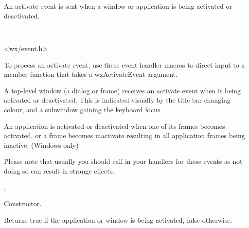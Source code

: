 \section{}\label{wxactivateevent}

An activate event is sent when a window or application is being activated
or deactivated.


\\


<wx/event.h>


To process an activate event, use these event handler macros to direct input to a member
function that takes a wxActivateEvent argument.

\twocolwidtha{7cm}
\begin{twocollist}\itemsep=0pt
\end{twocollist}%


A top-level window (a dialog or frame) receives an activate event when is
being activated or deactivated. This is indicated visually by the title
bar changing colour, and a subwindow gaining the keyboard focus.

An application is activated or deactivated when one of its frames becomes activated,
or a frame becomes inactivate resulting in all application frames being inactive. (Windows only)

Please note that usually you should call  in
your handlers for these events as not doing so can result in strange effects.


,\rtfsp
{}


\label{wxactivateeventctor}


Constructor.

\label{wxactivateeventgetactive}


Returns true if the application or window is being activated, false otherwise.

